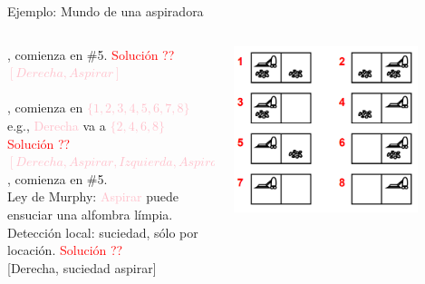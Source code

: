 \documentclass{beamer}
\theoremstyle{definition}
\theoremstyle{theorem}
\theoremstyle{remark}
\begin{document}
\begin{frame}{Ejemplo: Mundo de una aspiradora}
    \begin{columns}
      \begin{column}{0.6\textwidth}
        , comienza en \#5.
        \textcolor{red}{Solución ??}\\
        \textcolor{Pink}{$[Derecha, Aspirar]$}\\~\\
       
        , comienza en
        \textcolor{Pink}{$\{1,2,3,4,5,6,7,8\}$} e.g., \textcolor{Pink}{Derecha} va a \textcolor{Pink}{$\{2,4,6,8\}$}
        \textcolor{red}{Solución ??}\\
        \textcolor{Pink}{$[Derecha, Aspirar, Izquierda, Aspirar]$}\\
        
        , comienza en \#5.\\
        Ley de Murphy: \textcolor{Pink}{Aspirar} puede ensuciar una alfombra l\'impia.\\
        Detecci\'on local: suciedad, s\'olo por locaci\'on.
        \textcolor{red}{Soluci\'on ??}\\
        {[Derecha,  suciedad  aspirar]}
        \end{column}
      \begin{column}{0.4\textwidth}
      \includegraphics[width=0.8\textwidth]{9_image_example1.PNG}
      \end{column}
    \end{columns}
\end{frame}
\end{document}
